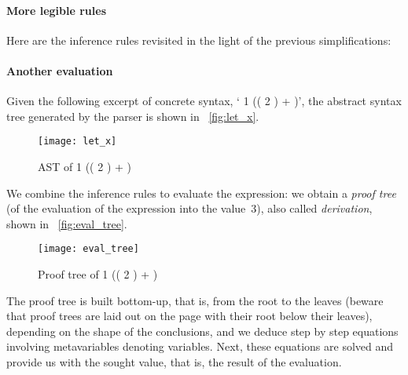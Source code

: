 \paragraph{More legible rules}

Here are the inference rules revisited in the light of the previous
simplifications:

\paragraph{Another evaluation}
Given the following excerpt of concrete syntax, `\Xlet {}
\equal \num{1} \Xin ((\Xlet {} \equal \num{2} \Xin {}) +
)', the abstract syntax tree generated by the parser is shown
in \fig~\vref{fig:let_x}.
\begin{figure}[b]
\centering
\texttt{[image: let\_x]}
\caption{AST of \Xlet {}
\equal \num{1} \Xin ((\Xlet {} \equal \num{2} \Xin {}) +
) \label{fig:let_x}}
\end{figure}
We combine the inference rules to evaluate the expression: we obtain a
\emph{proof tree} (of the evaluation of the expression into the
value~3), also called \emph{derivation}, shown in
\fig~\vref{fig:eval_tree}.
\begin{figure}
\centering
\texttt{[image: eval\_tree]}
\caption{Proof tree of \Xlet {}
\equal \num{1} \Xin ((\Xlet {} \equal \num{2} \Xin {}) +
) \label{fig:eval_tree}}
\end{figure}
The proof tree is built bottom\hyp{}up, that is, from the root to the
leaves (beware that proof trees are laid out on the page with their
root below their leaves), depending on the shape of the conclusions,
and we deduce step by step equations involving metavariables denoting
variables. Next, these equations are solved and provide us with the
sought value, that is, the result of the evaluation.

